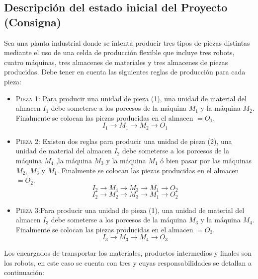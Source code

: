 \documentclass[10pt]{article} %
\begin{document}
\subsection{Descripción del estado inicial del Proyecto (Consigna)}
Sea una planta industrial donde se intenta producir tres tipos de piezas distintas mediante el uso de una celda de producción flexible que incluye tres robots, cuatro máquinas, tres almacenes de materiales y tres almacenes de piezas producidas.
Debe tener en cuenta las siguientes reglas de producción para cada pieza:
\begin{itemize}
\item \textsc{Pieza 1}: Para producir una unidad de pieza (1), una unidad de material del almacen $I_1$ debe someterse a los porcesos de la máquina $M_1$ y la máquina $M_2$. Finalmente se colocan las piezas producidas en el almacen $=O_1$.
$$I_1 \rightarrow M_1 \rightarrow M_2 \rightarrow O_1$$ 
\item \textsc{Pieza 2}: Existen dos reglas para producir una unidad de pieza (2), una unidad de material del almacen $I_2$ debe someterse a los porcesos de la máquina $M_4$ ,la máquina $M_3$ y la máquina $M_1$ ó bien pasar por las máquinas $M_2$, $M_3$ y $M_1$. Finalmente se colocan las piezas producidas en el almacen $=O_2$.
$$I_2 \rightarrow M_4 \rightarrow M_3 \rightarrow M_1 \rightarrow O_2$$
$$I_2 \rightarrow M_2 \rightarrow M_3 \rightarrow M_1 \rightarrow O_2$$
\item \textsc{Pieza 3}:Para producir una unidad de pieza (1), una unidad de material del almacen $I_3$ debe someterse a los porcesos de la máquina $M_3$ y la máquina $M_4$. Finalmente se colocan las piezas producidas en el almacen $=O_3$.
$$I_3 \rightarrow M_3 \rightarrow M_4 \rightarrow O_3$$ 
\end{itemize}
Los encargados de transportar los materiales, productos intermedios y finales son los robots, en este caso se cuenta con tres y cuyas responsabilidades se detallan a continuación:
\end{document}
